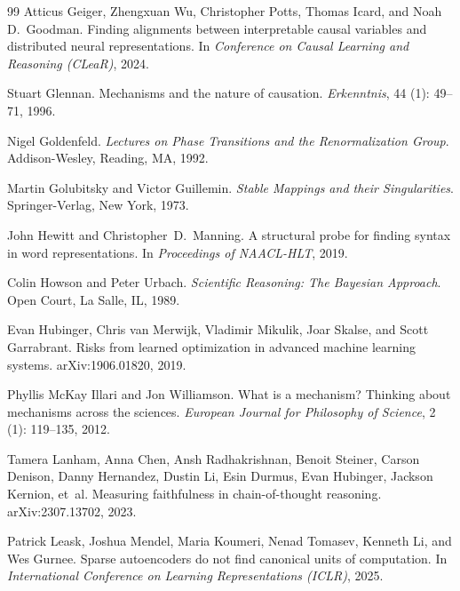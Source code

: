 \documentclass{article}
\begin{document}
\begin{thebibliography}{99}
Atticus Geiger, Zhengxuan Wu, Christopher Potts, Thomas Icard, and Noah D.\
  Goodman.
\newblock Finding alignments between interpretable causal variables and
  distributed neural representations.
\newblock In \emph{Conference on Causal Learning and Reasoning (CLeaR)}, 2024.

Stuart Glennan.
\newblock Mechanisms and the nature of causation.
\newblock \emph{Erkenntnis}, 44 (1): 49--71, 1996.

Nigel Goldenfeld.
\newblock \emph{Lectures on Phase Transitions and the Renormalization Group}.
\newblock Addison-Wesley, Reading, MA, 1992.

Martin Golubitsky and Victor Guillemin.
\newblock \emph{Stable Mappings and their Singularities}.
\newblock Springer-Verlag, New York, 1973.

John Hewitt and Christopher~D.\ Manning.
\newblock A structural probe for finding syntax in word representations.
\newblock In \emph{Proceedings of NAACL-HLT}, 2019.

Colin Howson and Peter Urbach.
\newblock \emph{Scientific Reasoning: The Bayesian Approach}.
\newblock Open Court, La Salle, IL, 1989.

Evan Hubinger, Chris van Merwijk, Vladimir Mikulik, Joar Skalse, and
  Scott Garrabrant.
\newblock Risks from learned optimization in advanced machine learning systems.
\newblock arXiv:1906.01820, 2019.

Phyllis McKay Illari and Jon Williamson.
\newblock What is a mechanism? Thinking about mechanisms across the sciences.
\newblock \emph{European Journal for Philosophy of Science},
  2 (1):\penalty0 119--135, 2012.

Tamera Lanham, Anna Chen, Ansh Radhakrishnan, Benoit Steiner, Carson Denison,
  Danny Hernandez, Dustin Li, Esin Durmus, Evan Hubinger, Jackson Kernion,
  et~al.
\newblock Measuring faithfulness in chain-of-thought reasoning.
\newblock arXiv:2307.13702, 2023.

Patrick Leask, Joshua Mendel, Maria Koumeri, Nenad Tomasev, Kenneth Li, and
  Wes Gurnee.
\newblock Sparse autoencoders do not find canonical units of computation.
\newblock In \emph{International Conference on Learning Representations
  (ICLR)}, 2025.


\end{thebibliography}
\end{document}
